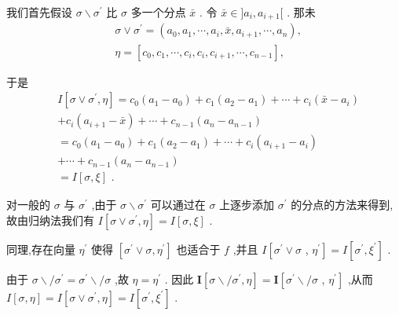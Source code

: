 我们首先假设 $\sigma  \smallsetminus  {\sigma }^{\prime }$ 比 $\sigma$ 多一个分点 $\bar{x}$ . 令 $\bar{x} \in  \rbrack {a}_{i},{a}_{i + 1}\lbrack$ . 那未
\begin{align*}
	&\sigma  \vee  {\sigma }^{\prime } = \left( {{a}_{0},{a}_{1},\cdots ,{a}_{i},\bar{x},{a}_{i + 1},\cdots ,{a}_{n}}\right) ,\\
	&\eta  = \left\lbrack  {{c}_{0},{c}_{1},\cdots ,{c}_{i},{c}_{i},{c}_{i + 1},\cdots ,{c}_{n - 1}}\right\rbrack  ,
\end{align*}

于是
\begin{align*}
	&I\left\lbrack  {\sigma  \vee  {\sigma }^{\prime },\eta }\right\rbrack   = {c}_{0}\left( {{a}_{1} - {a}_{0}}\right)  + {c}_{1}\left( {{a}_{2} - {a}_{1}}\right)  + \cdots  + {c}_{i}\left( {\bar{x} - {a}_{i}}\right)\\
	&+ {c}_{i}\left( {{a}_{i + 1} - \bar{x}}\right)  + \cdots  + {c}_{n - 1}\left( {{a}_{n} - {a}_{n - 1}}\right)\\
	&= {c}_{0}\left( {{a}_{1} - {a}_{0}}\right)  + {c}_{1}\left( {{a}_{2} - {a}_{1}}\right)  + \cdots  + {c}_{i}\left( {{a}_{i + 1} - {a}_{i}}\right)\\
	&+ \cdots  + {c}_{n - 1}\left( {{a}_{n} - {a}_{n - 1}}\right)\\
	&= I\left\lbrack  {\sigma ,\xi }\right\rbrack  \text{ . }
\end{align*}

对一般的 $\sigma$ 与 ${\sigma }^{\prime }$ ,由于 $\sigma  \smallsetminus  {\sigma }^{\prime }$ 可以通过在 $\sigma$ 上逐步添加 ${\sigma }^{\prime }$ 的分点的方法来得到,故由归纳法我们有 $I\left\lbrack  {\sigma  \vee  {\sigma }^{\prime },\eta }\right\rbrack   = I\left\lbrack  {\sigma ,\xi }\right\rbrack$ .

同理,存在向量 ${\eta }^{\prime }$ 使得 $\left\lbrack  {{\sigma }^{\prime } \vee  \sigma ,{\eta }^{\prime }}\right\rbrack$ 也适合于 $f$ ,并且 $I\left\lbrack  {{\sigma }^{\prime } \vee  \sigma }\right.$ , $\left. {\eta }^{\prime }\right\rbrack   = I\left\lbrack  {{\sigma }^{\prime },{\xi }^{\prime }}\right\rbrack$ .

由于 $\sigma  \smallsetminus  /{\sigma }^{\prime } = {\sigma }^{\prime } \smallsetminus  /\sigma$ ,故 $\eta  = {\eta }^{\prime }$ . 因此 $\mathbf{I}\left\lbrack  {\sigma  \smallsetminus  /{\sigma }^{\prime },\eta }\right\rbrack   = \mathbf{I}\left\lbrack  {{\sigma }^{\prime } \smallsetminus  /\sigma }\right.$ , $\left. {\eta }^{\prime }\right\rbrack$ ,从而 $I\left\lbrack  {\sigma ,\eta }\right\rbrack   = I\left\lbrack  {\sigma  \vee  {\sigma }^{\prime },\eta }\right\rbrack   = I\left\lbrack  {{\sigma }^{\prime },{\xi }^{\prime }}\right\rbrack$ .

